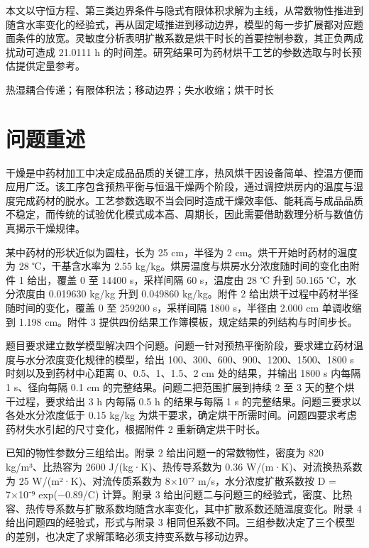 \documentclass[12pt,a4paper]{article}
\newcommand{\keywordfont}{\fontsize{12pt}{16pt}\selectfont\heiti\bfseries}
\newcommand{\paperstrong}[1]{{\heiti #1}}
\begin{document}
\indent 本文以守恒方程、第三类边界条件与隐式有限体积求解为主线，从常数物性推进到随含水率变化的经验式，再从固定域推进到移动边界，模型的每一步扩展都对应题面条件的放宽。灵敏度分析表明扩散系数是烘干时长的首要控制参数，其正负两成扰动可造成 21.0111 h 的时间差。研究结果可为药材烘干工艺的参数选取与时长预估提供定量参考。

\indent {\keywordfont \paperstrong{关键词：}} \paperstrong{热湿耦合传递}；\paperstrong{有限体积法}；\paperstrong{移动边界}；\paperstrong{失水收缩}；\paperstrong{烘干时长}\label{abstract:end}

\newpage

\section{问题重述}

干燥是中药材加工中决定成品品质的关键工序，热风烘干因设备简单、控温方便而应用广泛。该工序包含预热平衡与恒温干燥两个阶段，通过调控烘房内的温度与湿度完成药材的脱水。工艺参数选取不当会同时造成干燥效率低、能耗高与成品品质不稳定，而传统的试验优化模式成本高、周期长，因此需要借助数理分析与数值仿真揭示干燥规律。

某中药材的形状近似为圆柱，长为 25 cm，半径为 2 cm。烘干开始时药材的温度为 28 ℃，干基含水率为 2.55 kg/kg。烘房温度与烘房水分浓度随时间的变化由附件 1 给出，覆盖 0 至 14400 s，采样间隔 60 s，温度由 28 ℃ 升到 50.165 ℃，水分浓度由 0.019630 kg/kg 升到 0.049860 kg/kg。附件 2 给出烘干过程中药材半径随时间的变化，覆盖 0 至 259200 s，采样间隔 1800 s，半径由 2.000 cm 单调收缩到 1.198 cm。附件 3 提供四份结果工作簿模板，规定结果的列结构与时间步长。

题目要求建立数学模型解决四个问题。问题一针对预热平衡阶段，要求建立药材温度与水分浓度变化规律的模型，给出 100、300、600、900、1200、1500、1800 s 时刻以及到药材中心距离 0、0.5、1、1.5、2 cm 处的结果，并输出 1800 s 内每隔 1 s、径向每隔 0.1 cm 的完整结果。问题二把范围扩展到持续 2 至 3 天的整个烘干过程，要求给出 3 h 内每隔 0.5 h 的结果与每隔 1 s 的完整结果。问题三要求以各处水分浓度低于 0.15 kg/kg 为烘干要求，确定烘干所需时间。问题四要求考虑药材失水引起的尺寸变化，根据附件 2 重新确定烘干时长。

已知的物性参数分三组给出。附录 2 给出问题一的常数物性，密度为 820 kg/m³、比热容为 2600 J/(kg·K)、热传导系数为 0.36 W/(m·K)、对流换热系数为 25 W/(m²·K)、对流传质系数为 8×10⁻⁷ m/s，水分浓度扩散系数按 D = 7×10⁻⁹ exp(−0.89/C) 计算。附录 3 给出问题二与问题三的经验式，密度、比热容、热传导系数与扩散系数均随含水率变化，其中扩散系数还随温度变化。附录 4 给出问题四的经验式，形式与附录 3 相同但系数不同。三组参数决定了三个模型的差别，也决定了求解策略必须支持变系数与移动边界。
\end{document}
